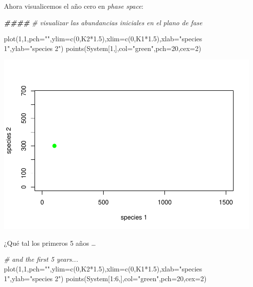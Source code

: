 \documentclass[
]{article}
\newenvironment{Shaded}{\begin{snugshade}}{\end{snugshade}}
\newcommand{\AttributeTok}[1]{\textcolor[rgb]{0.77,0.63,0.00}{#1}}
\newcommand{\CommentTok}[1]{\textcolor[rgb]{0.56,0.35,0.01}{\textit{#1}}}
\newcommand{\DecValTok}[1]{\textcolor[rgb]{0.00,0.00,0.81}{#1}}
\newcommand{\DocumentationTok}[1]{\textcolor[rgb]{0.56,0.35,0.01}{\textbf{\textit{#1}}}}
\newcommand{\FloatTok}[1]{\textcolor[rgb]{0.00,0.00,0.81}{#1}}
\newcommand{\FunctionTok}[1]{\textcolor[rgb]{0.00,0.00,0.00}{#1}}
\newcommand{\NormalTok}[1]{#1}
\newcommand{\SpecialCharTok}[1]{\textcolor[rgb]{0.00,0.00,0.00}{#1}}
\newcommand{\StringTok}[1]{\textcolor[rgb]{0.31,0.60,0.02}{#1}}
\begin{document}
Ahora visualicemos el año cero en \emph{phase space}:

\begin{Shaded}
\begin{Highlighting}[]
\DocumentationTok{\#\#\#\#}
\CommentTok{\# visualizar las abundancias iniciales en el plano de fase}

\FunctionTok{plot}\NormalTok{(}\DecValTok{1}\NormalTok{,}\DecValTok{1}\NormalTok{,}\AttributeTok{pch=}\StringTok{""}\NormalTok{,}\AttributeTok{ylim=}\FunctionTok{c}\NormalTok{(}\DecValTok{0}\NormalTok{,K2}\SpecialCharTok{*}\FloatTok{1.5}\NormalTok{),}\AttributeTok{xlim=}\FunctionTok{c}\NormalTok{(}\DecValTok{0}\NormalTok{,K1}\SpecialCharTok{*}\FloatTok{1.5}\NormalTok{),}\AttributeTok{xlab=}\StringTok{"species 1"}\NormalTok{,}\AttributeTok{ylab=}\StringTok{"species 2"}\NormalTok{)}
\FunctionTok{points}\NormalTok{(System[}\DecValTok{1}\NormalTok{,],}\AttributeTok{col=}\StringTok{"green"}\NormalTok{,}\AttributeTok{pch=}\DecValTok{20}\NormalTok{,}\AttributeTok{cex=}\DecValTok{2}\NormalTok{)}
\end{Highlighting}
\end{Shaded}

\includegraphics{LECTURE16_files/figure-latex/unnamed-chunk-3-1.pdf}

¿Qué tal los primeros 5 años \ldots{}

\begin{Shaded}
\begin{Highlighting}[]
\CommentTok{\# and the first 5 years...}
\FunctionTok{plot}\NormalTok{(}\DecValTok{1}\NormalTok{,}\DecValTok{1}\NormalTok{,}\AttributeTok{pch=}\StringTok{""}\NormalTok{,}\AttributeTok{ylim=}\FunctionTok{c}\NormalTok{(}\DecValTok{0}\NormalTok{,K2}\SpecialCharTok{*}\FloatTok{1.5}\NormalTok{),}\AttributeTok{xlim=}\FunctionTok{c}\NormalTok{(}\DecValTok{0}\NormalTok{,K1}\SpecialCharTok{*}\FloatTok{1.5}\NormalTok{),}\AttributeTok{xlab=}\StringTok{"species 1"}\NormalTok{,}\AttributeTok{ylab=}\StringTok{"species 2"}\NormalTok{)}
\FunctionTok{points}\NormalTok{(System[}\DecValTok{1}\SpecialCharTok{:}\DecValTok{6}\NormalTok{,],}\AttributeTok{col=}\StringTok{"green"}\NormalTok{,}\AttributeTok{pch=}\DecValTok{20}\NormalTok{,}\AttributeTok{cex=}\DecValTok{2}\NormalTok{)}
\end{Highlighting}
\end{Shaded}
\end{document}
